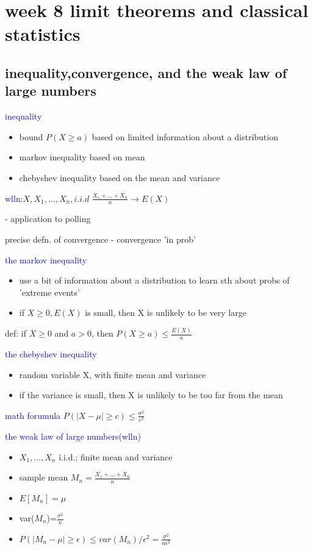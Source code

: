 \section*{week 8 limit theorems and classical statistics}

\subsection*{inequality,convergence, and the weak law of large numbers}

\textcolor{blue}{inequality}

\begin{itemize}
    \item bound $P(X\ge a)$ based on limited information about a distribution
    \item markov inequality based on mean
    \item chebyshev inequality based on the mean and variance 
\end{itemize}


\textcolor{blue}{wlln}:$X,X_1,...,X_n,i.i.d$ $\frac{X_1+...+X_n}{n}\to E(X)$

- application to polling

precise defn. of convergence
- convergence 'in prob'


\textcolor{blue}{the markov inequality}

\begin{itemize}
    \item use a bit of information about a distribution to learn sth about probs of 'extreme events'
    \item  if $X\ge 0, E(X)$ is small, then X is unlikely to be very large
\end{itemize}

def: if $X\geq 0$ and $a>0$, then $P(X\geq a)\leq \frac{E(X)}{a}$


\textcolor{blue}{the chebyshev inequality}

\begin{itemize}
    \item random variable X, with finite mean and variance
    \item if the variance is small, then X is unlikely to be too far from the mean
\end{itemize}

\textcolor{blue}{math forumula} $P(|X-\mu|\geq c)\leq \frac{\sigma^2}{c^2}$


\textcolor{blue}{the weak law of large numbers(wlln)}
\begin{itemize}
    \item $X_1,...,X_n$ i.i.d.; finite mean and variance
    \item sample mean $M_n=\frac{X_1+...+X_n}{n}$
    \item $E[M_n]=\mu$
    \item var($M_n$)=$\frac{\sigma^2}{n}$
    \item $P(|M_n-\mu|\ge \epsilon)\le var(M_n)/\epsilon^2=\frac{\sigma^2}{n\epsilon^2}$
\end{itemize}


